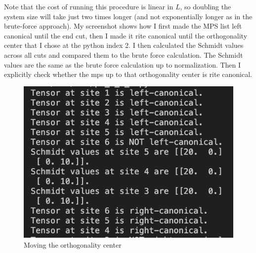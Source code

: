 \documentclass[12pt]{article}
\begin{document}
Note that the cost of running this procedure is linear in $L$, so doubling the system size will take just two times longer (and not exponentially longer as in the brute-force approach).
\newpage
My screenshot shows how I first made the MPS list left canonical until the end cut, then I made it rite canonical until the orthogonality center that I chose at the python index 2. I then calculated the Schmidt values across all cuts and compared them to the brute force calculation. The Schmidt values are the same as the brute force calculation up to normalization. Then I explicitly check whether the mps up to that orthogonality center is rite canonical.
\begin{figure}
\centering
\includegraphics[width=\textwidth]{move.png}
\caption{Moving the orthogonality center}
\end{figure}
\end{document}
